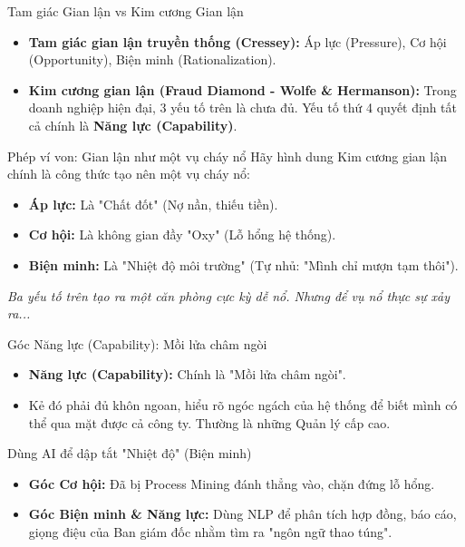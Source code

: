 \documentclass[aspectratio=169]{beamer}
\begin{document}
\begin{frame}{Tam giác Gian lận vs Kim cương Gian lận}
    \begin{itemize}
        \item \textbf{Tam giác gian lận truyền thống (Cressey):} Áp lực (Pressure), Cơ hội (Opportunity), Biện minh (Rationalization).
        \item \textbf{Kim cương gian lận (Fraud Diamond - Wolfe \& Hermanson):} Trong doanh nghiệp hiện đại, 3 yếu tố trên là chưa đủ. Yếu tố thứ 4 quyết định tất cả chính là \textbf{Năng lực (Capability)}.
    \end{itemize}
\end{frame}

\begin{frame}{Phép ví von: Gian lận như một vụ cháy nổ}
    Hãy hình dung Kim cương gian lận chính là công thức tạo nên một vụ cháy nổ:
    \begin{itemize}
        \item \textbf{Áp lực:} Là "Chất đốt" (Nợ nần, thiếu tiền).
        \item \textbf{Cơ hội:} Là không gian đầy "Oxy" (Lỗ hổng hệ thống).
        \item \textbf{Biện minh:} Là "Nhiệt độ môi trường" (Tự nhủ: "Mình chỉ mượn tạm thôi").
    \end{itemize}
    \textit{Ba yếu tố trên tạo ra một căn phòng cực kỳ dễ nổ. Nhưng để vụ nổ thực sự xảy ra...}
\end{frame}

\begin{frame}{Góc Năng lực (Capability): Mồi lửa châm ngòi}
    \begin{itemize}
        \item \textbf{Năng lực (Capability):} Chính là "Mồi lửa châm ngòi".
        \item Kẻ đó phải đủ khôn ngoan, hiểu rõ ngóc ngách của hệ thống để biết mình có thể qua mặt được cả công ty. Thường là những Quản lý cấp cao.
    \end{itemize}
\end{frame}

\begin{frame}{Dùng AI để dập tắt "Nhiệt độ" (Biện minh)}
    \begin{itemize}
        \item \textbf{Góc Cơ hội:} Đã bị Process Mining đánh thẳng vào, chặn đứng lỗ hổng.
        \item \textbf{Góc Biện minh \& Năng lực:} Dùng NLP để phân tích hợp đồng, báo cáo, giọng điệu của Ban giám đốc nhằm tìm ra "ngôn ngữ thao túng".
    \end{itemize}
\end{frame}
\end{document}
